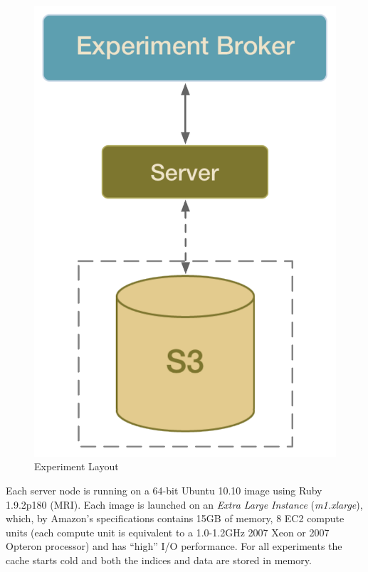 \begin{figure}[htp]
\begin{center}
\includegraphics[scale=0.4]{figures/experiment_setup.pdf}
\end{center}
\caption{Experiment Layout}
\label{fig:experiment_layout}
\end{figure}

Each server node is running on a 64-bit Ubuntu 10.10 image using Ruby
1.9.2p180 (MRI). Each image is launched on an \textit{Extra Large Instance}
(\emph{m1.xlarge}), which, by Amazon's specifications contains 15GB of memory,
8 EC2 compute units (each compute unit is equivalent to a 1.0-1.2GHz 2007 Xeon
or 2007 Opteron processor) and has ``high'' I/O performance. For all
experiments the cache starts cold and both the indices and data are stored in
memory.

